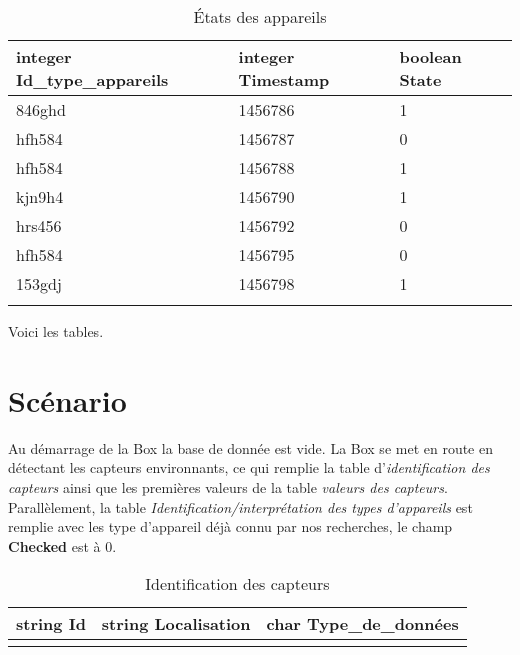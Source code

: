 \documentclass[10pt,a4paper]{article}
\begin{document}
\begin{table}[h!]
\centering
    \begin{tabular}{|l|l|l|}
    \hline
    \rowcolor[HTML]{EFEFEF} 
    integer Id\_type\_appareils & integer Timestamp & boolean State \\ \hline
    846ghd                               & 1456786           & 1             \\ \hline
    hfh584                               & 1456787           & 0             \\ \hline
    hfh584                               & 1456788           & 1             \\ \hline
    kjn9h4                               & 1456790           & 1             \\ \hline
    hrs456                               & 1456792           & 0             \\ \hline
    hfh584                               & 1456795           & 0             \\ \hline
    153gdj                               & 1456798           & 1             \\ \hline
                                    &                   &              
    \end{tabular}
    \caption{États des appareils}
\end{table}
\newpage
Voici les tables.
\newpage
\section{Scénario}
Au démarrage de la Box la base de donnée est vide. La Box se met en route en détectant les capteurs environnants, ce qui remplie la table d'\textit{identification des capteurs} ainsi que les premières valeurs de la table\textit{ valeurs des capteurs}. Parallèlement, la table \textit{Identification/interprétation des types d'appareils} est remplie avec les type d'appareil déjà connu par nos recherches, le champ \textbf{Checked} est à 0. \\
\begin{table}[h!]
    \centering
    \begin{tabular}{|l|l|l|}
    \hline
    \rowcolor[HTML]{EFEFEF} 
    string Id & string Localisation & char Type\_de\_données \\ \hline
              &                     &                       
    \end{tabular}
    \caption{Identification des capteurs}
\end{table}
\end{document}
